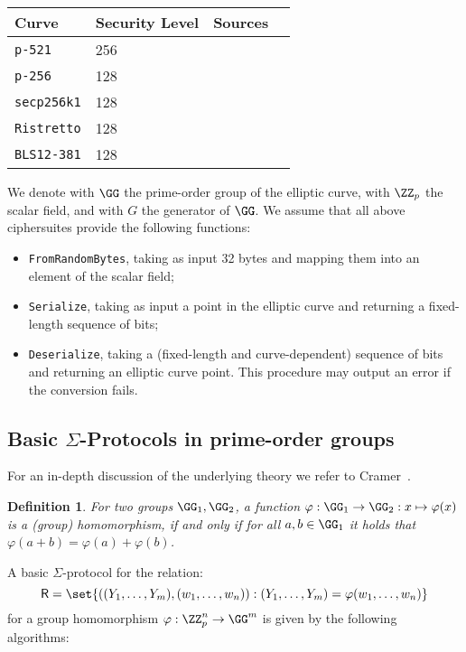 \documentclass[runningheads,11pt]{article}
\newtheorem{definition}{Definition}
\begin{document}
 \vspace{1em}
 \begin{center}
 \begin{tabular}{llcc}
  \hline
  Curve  & Security Level & Sources \\
  \hline
  \verb|p-521|     & 256& \cite{fips2} \\
  \verb|p-256|     & 128 & \cite{fips2}  \\
  \verb|secp256k1| & 128 & \cite{SECG} \\
  \verb|Ristretto| & 128 & \cite{cfrg-ristretto-decaf} \\
  \verb|BLS12-381| & 128 & \cite{bls12} \\
 \end{tabular}
\end{center}
We denote with $\GG$ the prime-order group of the elliptic curve, with $\ZZ_p$ the scalar field, and with $G$ the generator of $\GG$.
We assume that all above ciphersuites provide the following functions:

\begin{itemize}
  \item \texttt{FromRandomBytes}, taking as input 32 bytes and mapping them into an element of the scalar field;
  \item \texttt{Serialize}, taking as input a point in the elliptic curve and returning a fixed-length sequence of bits;
  \item \texttt{Deserialize}, taking a (fixed-length and curve-dependent) sequence of bits and returning an elliptic curve point. This procedure may output an error if the conversion fails.
\end{itemize}

\subsection{Basic $\Sigma$-Protocols in prime-order groups}
For an in-depth discussion of the underlying theory we refer to Cramer~\cite{cramer97}.
 \begin{definition}
  For two groups $\GG_1,\GG_2$, a function $\varphi:\GG_1\to\GG_2:x\mapsto\varphi(x)$ is a \emph{(group) homomorphism}, if and only if for all $a,b\in\GG_1$ it holds that $\varphi(a+b)=\varphi(a)+\varphi(b)$.
\end{definition}




\label{sec:sigma-dlog}
A basic $\Sigma$-protocol for the relation:
\[
  \relation=\set{((\statement_1,\dots,\statement_m),(w_1,\dots,w_n)) : (\statement_1,\dots,\statement_m)=\varphi(w_1,\dots,w_n)}
\]
 for a group homomorphism $\varphi:\ZZ_p^n\to\GG^m$ is given by the following algorithms:
\end{document}
